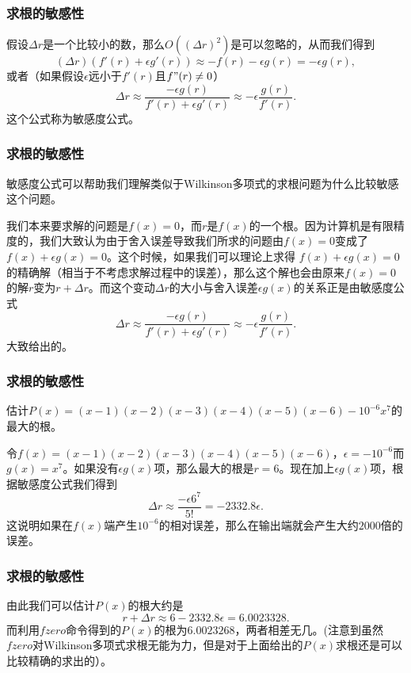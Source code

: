 \documentclass[10pt]{beamer}
\begin{document}
\begin{frame}
\frametitle{求根的敏感性}
假设$\Delta r$是一个比较小的数，那么$O((\Delta r)^2)$是可以忽略的，从而我们得到
\begin{equation}
(\Delta r) (f'(r) + \epsilon g'(r)) \approx -f(r) - \epsilon g(r) = - \epsilon g(r),
\end{equation}
或者（如果假设$\epsilon$远小于$f'(r)$且$f"(r) \neq 0$）
\begin{equation}
\Delta r \approx \frac{ - \epsilon g(r)}{f'(r) + \epsilon g'(r)} \approx -\epsilon \frac{g(r)}{f'(r)}.
\end{equation}
这个公式称为敏感度公式。
\end{frame}


\begin{frame}
\frametitle{求根的敏感性}
敏感度公式可以帮助我们理解类似于Wilkinson多项式的求根问题为什么比较敏感这个问题。

\vspace{0.2cm}

我们本来要求解的问题是$f(x) = 0$，而$r$是$f(x)$的一个根。因为计算机是有限精度的，我们大致认为由于舍入误差导致我们所求的问题由$f(x) = 0$变成了$f(x) + \epsilon g(x) = 0$。这个时候，如果我们可以理论上求得
$f(x) + \epsilon g(x) = 0$的精确解（相当于不考虑求解过程中的误差），那么这个解也会由原来$f(x) = 0$的解$r$变为$r + \Delta r$。而这个变动$\Delta r$的大小与舍入误差$\epsilon g(x)$的关系正是由敏感度公式
\begin{equation}
\Delta r \approx \frac{ - \epsilon g(r)}{f'(r) + \epsilon g'(r)} \approx -\epsilon \frac{g(r)}{f'(r)}.
\end{equation}
大致给出的。
\end{frame}


\begin{frame}
\frametitle{求根的敏感性}
\begin{example}
估计$P(x) = (x-1)(x-2)(x-3)(x-4)(x-5)(x-6) - 10^{-6}x^7$的最大的根。
\end{example}
令$f(x) = (x-1)(x-2)(x-3)(x-4)(x-5)(x-6)$，$\epsilon = -10^{-6}$而$g(x) = x^{7}$。如果没有$\epsilon g(x)$项，那么最大的根是$r = 6$。现在加上$\epsilon g(x)$项，根据敏感度公式我们得到
\begin{equation}
\Delta r \approx \frac{-\epsilon 6^7}{5!} = -2332.8 \epsilon.
\end{equation}
这说明如果在$f(x)$端产生$10^{-6}$的相对误差，那么在输出端就会产生大约$2000$倍的误差。
\end{frame}


\begin{frame}
\frametitle{求根的敏感性}
由此我们可以估计$P(x)$的根大约是
\begin{equation}
r + \Delta r \approx 6 - 2332.8 \epsilon = 6.0023328.
\end{equation}
而利用$fzero$命令得到的$P(x)$的根为$6.0023268$，两者相差无几。(注意到虽然$fzero$对Wilkinson多项式求根无能为力，但是对于上面给出的$P(x)$求根还是可以比较精确的求出的）。
\end{frame}
\end{document}
